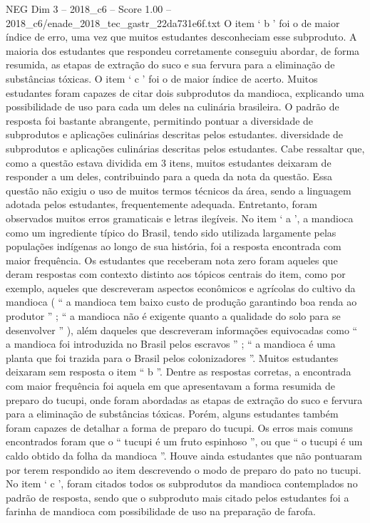 \begin{textsample}{NEG Dim 3 – 2018\_c6 – Score 1.00 – 2018\_c6/enade\_2018\_tec\_gastr\_22da731e6f.txt}
O item ‘ b ’ foi o de maior índice de erro, uma vez que muitos estudantes desconheciam esse subproduto.
A maioria dos estudantes que respondeu corretamente conseguiu abordar, de forma resumida, as etapas de extração do suco e sua fervura para a eliminação de substâncias tóxicas.
O item ‘ c ’ foi o de maior índice de acerto.
Muitos estudantes foram capazes de citar dois subprodutos da mandioca, explicando uma possibilidade de uso para cada um deles na culinária brasileira.
O padrão de resposta foi bastante abrangente, permitindo pontuar a diversidade de subprodutos e aplicações culinárias descritas pelos estudantes. diversidade de subprodutos e aplicações culinárias descritas pelos estudantes.
Cabe ressaltar que, como a questão estava dividida em 3 itens, muitos estudantes deixaram de responder a um deles, contribuindo para a queda da nota da questão.
Essa questão não exigiu o uso de muitos termos técnicos da área, sendo a linguagem adotada pelos estudantes, frequentemente adequada.
Entretanto, foram observados muitos erros gramaticais e letras ilegíveis.
No item ‘ a ’, a mandioca como um ingrediente típico do Brasil, tendo sido utilizada largamente pelas populações indígenas ao longo de sua história, foi a resposta encontrada com maior frequência.
Os estudantes que receberam nota zero foram aqueles que deram respostas com contexto distinto aos tópicos centrais do item, como por exemplo, aqueles que descreveram aspectos econômicos e agrícolas do cultivo da mandioca ( “ a mandioca tem baixo custo de produção garantindo boa renda ao produtor ” ; “ a mandioca não é exigente quanto a qualidade do solo para se desenvolver ” ), além daqueles que descreveram informações equivocadas como “ a mandioca foi introduzida no Brasil pelos escravos ” ; “ a mandioca é uma planta que foi trazida para o Brasil pelos colonizadores ”.
Muitos estudantes deixaram sem resposta o item “ b ”.
Dentre as respostas corretas, a encontrada com maior frequência foi aquela em que apresentavam a forma resumida de preparo do tucupi, onde foram abordadas as etapas de extração do suco e fervura para a eliminação de substâncias tóxicas.
Porém, alguns estudantes também foram capazes de detalhar a forma de preparo do tucupi.
Os erros mais comuns encontrados foram que o “ tucupi é um fruto espinhoso ”, ou que “ o tucupi é um caldo obtido da folha da mandioca ”.
Houve ainda estudantes que não pontuaram por terem respondido ao item descrevendo o modo de preparo do pato no tucupi.
No item ‘ c ’, foram citados todos os subprodutos da mandioca contemplados no padrão de resposta, sendo que o subproduto mais citado pelos estudantes foi a farinha de mandioca com possibilidade de uso na preparação de farofa.

\end{textsample}
